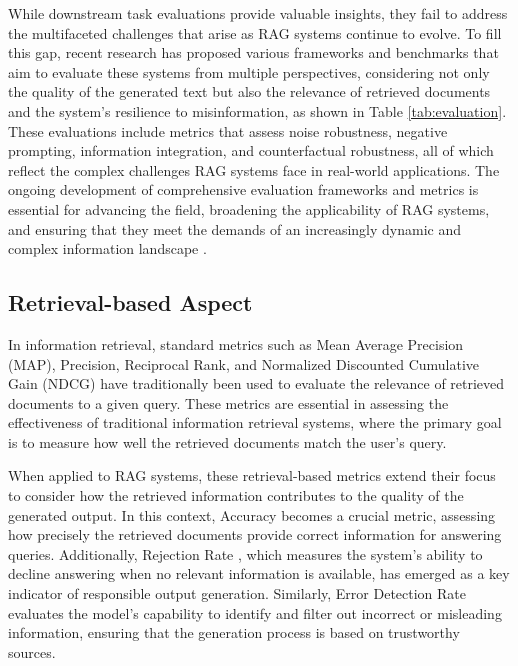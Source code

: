 While downstream task evaluations provide valuable insights, they fail to address the multifaceted challenges that arise as RAG systems continue to evolve. To fill this gap, recent research has proposed various frameworks and benchmarks that aim to evaluate these systems from multiple perspectives, considering not only the quality of the generated text but also the relevance of retrieved documents and the system’s resilience to misinformation, as shown in Table \ref{tab:evaluation}. These evaluations include metrics that assess noise robustness, negative prompting, information integration, and counterfactual robustness, all of which reflect the complex challenges RAG systems face in real-world applications. The ongoing development of comprehensive evaluation frameworks and metrics is essential for advancing the field, broadening the applicability of RAG systems, and ensuring that they meet the demands of an increasingly dynamic and complex information landscape \cite{yu2024evaluation}.

\subsection{Retrieval-based Aspect}
In information retrieval, standard metrics such as Mean Average Precision (MAP), Precision, Reciprocal Rank, and Normalized Discounted Cumulative Gain (NDCG) \cite{radlinski2010comparing, reimers2019sentencebert, nogueira2019multistage} have traditionally been used to evaluate the relevance of retrieved documents to a given query. These metrics are essential in assessing the effectiveness of traditional information retrieval systems, where the primary goal is to measure how well the retrieved documents match the user’s query.

When applied to RAG systems, these retrieval-based metrics extend their focus to consider how the retrieved information contributes to the quality of the generated output. In this context, Accuracy becomes a crucial metric, assessing how precisely the retrieved documents provide correct information for answering queries. Additionally, Rejection Rate \cite{chen2024benchmarking}, which measures the system’s ability to decline answering when no relevant information is available, has emerged as a key indicator of responsible output generation. Similarly, Error Detection Rate \cite{chen2024benchmarking} evaluates the model’s capability to identify and filter out incorrect or misleading information, ensuring that the generation process is based on trustworthy sources.

